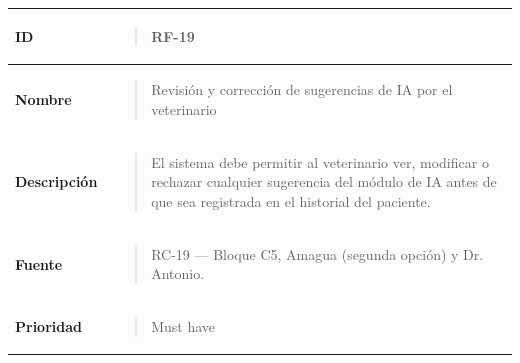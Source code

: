\documentclass[
]{article}
\newcounter{none} %
\begin{document}
{\def\LTcaptype{none} %
\begin{longtable}[]{@{}
  >{\raggedright\arraybackslash}p{}
  >{\raggedright\arraybackslash}p{}@{}}
\toprule\noalign{}
\begin{minipage}[b]{\linewidth}\raggedright
\textbf{ID}
\end{minipage} & \begin{minipage}[b]{\linewidth}\raggedright
\begin{quote}
RF-19
\end{quote}
\end{minipage} \\
\midrule\noalign{}
\endhead
\bottomrule\noalign{}
\endlastfoot
\textbf{Nombre} & \begin{minipage}[t]{\linewidth}\raggedright
\begin{quote}
Revisión y corrección de sugerencias de IA por el veterinario
\end{quote}
\end{minipage} \\
\textbf{Descripción} & \begin{minipage}[t]{\linewidth}\raggedright
\begin{quote}
El sistema debe permitir al veterinario ver, modificar o rechazar
cualquier sugerencia del módulo de IA antes de que sea registrada en el
historial del paciente.
\end{quote}
\end{minipage} \\
\textbf{Fuente} & \begin{minipage}[t]{\linewidth}\raggedright
\begin{quote}
RC-19 --- Bloque C5, Amagua (segunda opción) y Dr. Antonio.
\end{quote}
\end{minipage} \\
\textbf{Prioridad} & \begin{minipage}[t]{\linewidth}\raggedright
\begin{quote}
Must have
\end{quote}
\end{minipage} \\
\end{longtable}
}
\end{document}
